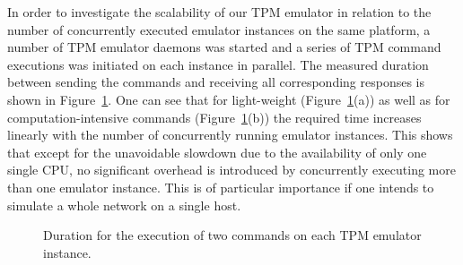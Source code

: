 \documentclass[runningheads]{llncs}
\begin{document}
In order to investigate the scalability of our TPM emulator in relation to
the number of concurrently executed emulator instances on the same platform,
a number of TPM emulator daemons was started and a series of TPM command
executions was initiated on each instance in parallel.
The measured duration between sending the commands and
receiving all corresponding responses is shown in
Figure~\ref{plot:execution_time}. One can see that for light-weight
(Figure~\ref{plot:execution_time}(a)) as well as for computation-intensive
commands (Figure~\ref{plot:execution_time}(b)) the required time increases
linearly with the number of concurrently running emulator instances. This
shows that except for the unavoidable slowdown due to the availability of
only one single CPU, no significant overhead is introduced by concurrently
executing more than one emulator instance. This is of particular importance
if one intends to simulate a whole network on a single host.

\begin{figure}
	\begin{center}
		\quad%
		\vspace*{-3mm}
		\caption{Duration for the execution of two commands on each TPM emulator
			instance.}
		\label{plot:execution_time}
	\end{center}
\end{figure}
\end{document}
